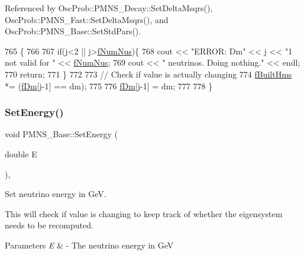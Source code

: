 Referenced by Osc\+Prob\+::\+P\+M\+N\+S\+\_\+\+Decay\+::\+Set\+Delta\+Msqrs(), Osc\+Prob\+::\+P\+M\+N\+S\+\_\+\+Fast\+::\+Set\+Delta\+Msqrs(), and Osc\+Prob\+::\+P\+M\+N\+S\+\_\+\+Base\+::\+Set\+Std\+Pars().


\begin{DoxyCode}
765 \{
766 
767   \textcolor{keywordflow}{if}(j<2 || j>\hyperlink{classOscProb_1_1PMNS__Base_a24bb74bed63569dfe88b18fa6a08060e}{fNumNus})\{
768     cout << \textcolor{stringliteral}{"ERROR: Dm"} << j << \textcolor{stringliteral}{"1 not valid for "} << \hyperlink{classOscProb_1_1PMNS__Base_a24bb74bed63569dfe88b18fa6a08060e}{fNumNus};
769     cout << \textcolor{stringliteral}{" neutrinos. Doing nothing."} << endl;
770     \textcolor{keywordflow}{return};
771   \}
772 
773   \textcolor{comment}{// Check if value is actually changing}
774   \hyperlink{classOscProb_1_1PMNS__Base_a9ac3cadeac8db1b90f3152f476244780}{fBuiltHms} *= (\hyperlink{classOscProb_1_1PMNS__Base_a406a31c3b5d620e5a0cace5b411f9f70}{fDm}[j-1] == dm);
775 
776   \hyperlink{classOscProb_1_1PMNS__Base_a406a31c3b5d620e5a0cace5b411f9f70}{fDm}[j-1] = dm;
777 
778 \}
\end{DoxyCode}
\mbox{\label{classOscProb_1_1PMNS__Base_a95b3b0d0cab5e6a54b5ef99587f837c0}} 
\subsubsection{\texorpdfstring{Set\+Energy()}{SetEnergy()}}
{\footnotesize\ttfamily void P\+M\+N\+S\+\_\+\+Base\+::\+Set\+Energy (\begin{DoxyParamCaption}\item[{double}]{E }\end{DoxyParamCaption})\hspace{0.3cm}{\ttfamily [virtual]}, {\ttfamily [inherited]}}

Set neutrino energy in GeV.

This will check if value is changing to keep track of whether the eigensystem needs to be recomputed.


\begin{DoxyParams}{Parameters}
{\em E} & -\/ The neutrino energy in GeV \\
\hline
\end{DoxyParams}



